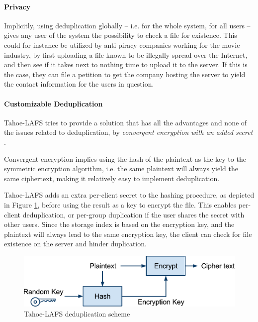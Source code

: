 \documentclass[pdftex,english,10pt,b5paper,twoside]{book}
\begin{document}
\paragraph{Privacy} Implicitly, using deduplication globally -- i.e. for the
whole system, for all users -- gives any user of the system the possibility to
check a file for existence. This could for instance be utilized by anti piracy
companies working for the movie industry, by first uploading a file known to be
illegally spread over the Internet, and then see if it takes next to nothing
time to upload it to the server. If this is the case, they can file a petition
to get the company hosting the server to yield the contact information for the
users in question.

\paragraph{Customizable Deduplication} Tahoe-\ac{LAFS} tries to provide a
solution that has all the advantages and none of the issues related to
deduplication, by \emph{convergent encryption with an added secret}
\cite{tahoe}.

Convergent encryption implies using the hash of the plaintext as the key to the
symmetric encryption algorithm, i.e. the same plaintext will always yield the
same ciphertext, making it relatively easy to implement deduplication.

Tahoe-\ac{LAFS} adds an extra per-client secret to the hashing procedure, as
depicted in Figure \ref{fig:tahoe:dedup}, before using the result as a key to
encrypt the file. This enables per-client deduplication, or per-group
duplication if the user shares the secret with other users. Since the storage
index is based on the encryption key, and the plaintext will always lead to the
same encryption key, the client can check for file existence on the server and
hinder duplication.

\begin{figure}[!h]
    \centering
    \includegraphics[scale=0.55]{TahoeDeduplication.pdf}
    \caption{Tahoe-LAFS deduplication scheme}
    \label{fig:tahoe:dedup}
\end{figure}
\end{document}
